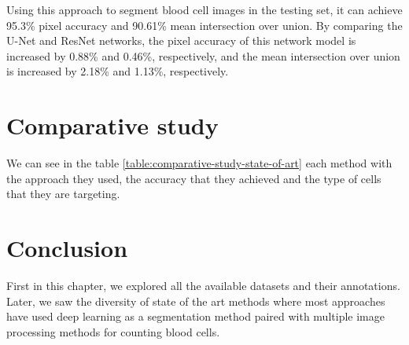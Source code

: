 Using this approach to segment blood cell images in the testing set, it can achieve 95.3\% pixel accuracy and 90.61\% mean intersection over union. By comparing the U-Net and ResNet networks, the pixel accuracy of this network model is increased by 0.88\% and 0.46\%, respectively, and the mean intersection over union is increased by 2.18\% and 1.13\%, respectively.

\section{Comparative study}



We can see in the table \ref{table:comparative-study-state-of-art} each method with the approach they used, the accuracy that they achieved and the type of cells that they are  targeting.

\section{Conclusion}
\vspace{0.1in}
\hspace{\parindent}
First in this chapter, we explored all the available datasets and their annotations. Later, we saw the diversity of state of the art methods where most approaches have used deep learning as a segmentation method paired with multiple image processing methods for counting blood cells.


